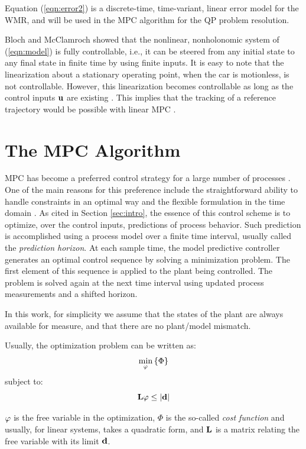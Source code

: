 \documentclass[twocolumn]{IEEEtran} %
\begin{document}
Equation (\ref{eqn:error2}) is a discrete-time, time-variant, linear error model for the WMR, and will be used in the MPC algorithm for the QP problem resolution.

Bloch and McClamroch \cite{bloch89} showed that the nonlinear, nonholonomic system of (\ref{eqn:model}) is fully controllable, i.e., it can be steered from any initial state to any final state in finite time by using finite inputs. It is easy to note that the linearization about a stationary operating point, when the car is motionless, is not controllable. However, this linearization becomes controllable as long as the control inputs ${\bf u}$ are existing \cite{samson91}. This implies that the tracking of a reference trajectory would be possible with linear MPC \cite{essen01}.

\section{The MPC Algorithm}\label{sec:mpc}
MPC has become a preferred control strategy for a large number of processes \cite{rawlings93}. One of the main reasons for this preference include the straightforward ability to handle constraints in an optimal way and the flexible formulation in the time domain \cite{allgower99,garcia89}. As cited in Section \ref{sec:intro}, the essence of this control scheme is to optimize, over the control inputs, predictions of process behavior. Such prediction is accomplished using a process model over a finite time interval, usually called the {\em prediction horizon}. At each sample time, the model predictive controller generates an optimal control sequence by solving a minimization problem. The first element of this sequence is applied to the plant being controlled. The problem is solved again at the next time interval using updated process measurements and a shifted horizon.

In this work, for simplicity we assume that the states of the plant are always available for measure, and that there are no plant/model mismatch.

Usually, the optimization problem can be written as:
\begin{equation}
	\min_{\bf\varphi}\left\{\Phi\right\}
\end{equation}
subject to:
\begin{equation}\label{eqn:constr}
	{\bf L{\bf\varphi}} \leq |{\bf d}|
\end{equation}

${\bf\varphi}$ is the free variable in the optimization, $\Phi$ is the so-called {\em cost function} and usually, for linear systems, takes a quadratic form, and ${\bf L}$ is a matrix relating the free variable with its limit ${\bf d}$.
\end{document}
